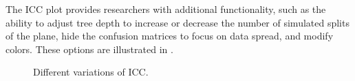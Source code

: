 \documentclass[11pt]{article}
\begin{document}
The ICC plot provides researchers with additional functionality, such as the ability to adjust tree depth to increase or decrease the number of simulated splits of the plane, hide the confusion matrices to focus on data spread, and modify colors. These options are illustrated in .

\begin{figure}[H]
        	\centering
           \caption{Different variations of ICC.}
           \label{fig:fig3}
\end{figure}    
\end{document}
